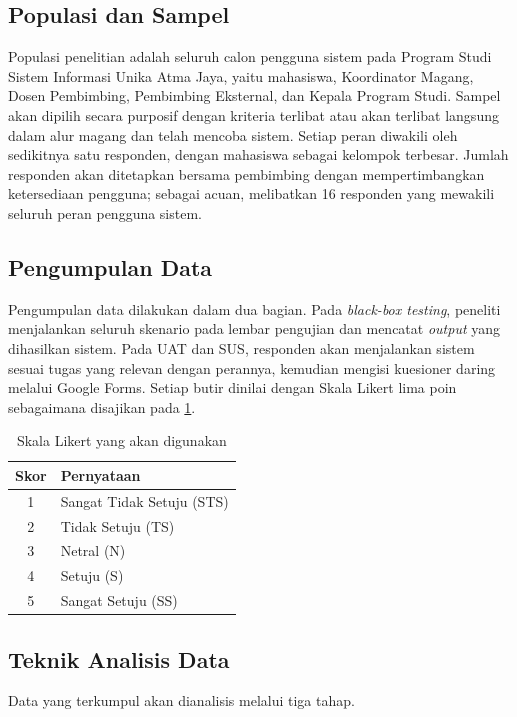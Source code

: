 \subsection{Populasi dan Sampel}
Populasi penelitian adalah seluruh calon pengguna sistem pada Program Studi
Sistem Informasi Unika Atma Jaya, yaitu mahasiswa, Koordinator Magang, Dosen
Pembimbing, Pembimbing Eksternal, dan Kepala Program Studi. Sampel akan dipilih
secara purposif dengan kriteria terlibat atau akan terlibat langsung dalam alur
magang dan telah mencoba sistem. Setiap peran diwakili oleh sedikitnya satu
responden, dengan mahasiswa sebagai kelompok terbesar. Jumlah responden akan
ditetapkan bersama pembimbing dengan mempertimbangkan ketersediaan pengguna;
sebagai acuan, \cite{AliyahAliyah2025} melibatkan 16 responden yang
mewakili seluruh peran pengguna sistem.

\subsection{Pengumpulan Data}
Pengumpulan data dilakukan dalam dua bagian. Pada \textit{black-box testing},
peneliti menjalankan seluruh skenario pada lembar pengujian dan mencatat
\textit{output} yang dihasilkan sistem. Pada UAT dan SUS, responden akan
menjalankan sistem sesuai tugas yang relevan dengan perannya, kemudian mengisi
kuesioner daring melalui Google Forms. Setiap butir dinilai dengan Skala Likert
lima poin sebagaimana disajikan pada \cref{tab:likertproposal}.

\begin{table}[H]
    \centering
    \caption{Skala Likert yang akan digunakan}
    \label{tab:likertproposal}
    \small
    \begin{tabular}{|c|l|}
        \hline
        \textbf{Skor} & \textbf{Pernyataan} \\ \hline
        1 & Sangat Tidak Setuju (STS) \\ \hline
        2 & Tidak Setuju (TS)         \\ \hline
        3 & Netral (N)                \\ \hline
        4 & Setuju (S)                \\ \hline
        5 & Sangat Setuju (SS)        \\ \hline
    \end{tabular}
\end{table}

\subsection{Teknik Analisis Data}
Data yang terkumpul akan dianalisis melalui tiga tahap.

